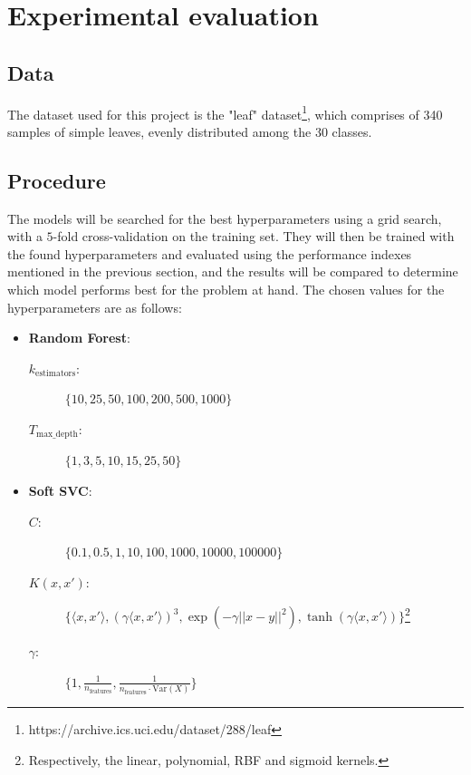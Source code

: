 \documentclass{article}
\begin{document}
\section{Experimental evaluation}



\subsection{Data}
The dataset used for this project is the "leaf" dataset\footnote{https://archive.ics.uci.edu/dataset/288/leaf}, 
which comprises of 340 samples of simple leaves, evenly distributed among the 30 classes.



\subsection{Procedure}
The models will be searched for the best hyperparameters using a grid search, with a $5$-fold cross-validation on the training set.
They will then be trained with the found hyperparameters and evaluated using the performance indexes mentioned in the previous section, and the results will be compared to determine which model performs best for the problem at hand.
The chosen values for the hyperparameters are as follows:
\begin{itemize}
    \item \textbf{Random Forest}: 
    \begin{description}
        \item[$k_{\text{estimators}}$:] $\{10, 25, 50, 100, 200, 500, 1000\}$
        \item[$T_{\text{max\_depth}}$:] $\{1, 3, 5, 10, 15, 25, 50\}$
    \end{description}
    \item \textbf{Soft SVC}: 
    \begin{description}
        \item[$C$:] $\{0.1, 0.5, 1, 10, 100, 1000, 10000, 100000\}$
        \item[$K(x, x')$:] $\{\langle x, x' \rangle, (\gamma \langle x, x' \rangle)^3, \exp(-\gamma ||x-y||^2), \tanh(\gamma\langle x, x' \rangle)\}$\footnote{Respectively, the linear, polynomial, RBF and sigmoid kernels.}
        \item[$\gamma$:] $\{1, \frac{1}{n_{\text{features}}}, \frac{1}{n_{\text{features}} \cdot \text{Var}(X)}\}$
    \end{description}
\end{itemize}
\end{document}
